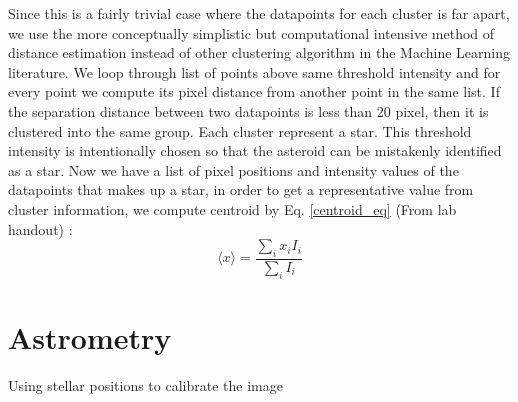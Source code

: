 \documentclass[authoryear, 12pt,5p, times]{elsarticle}
\begin{document}
Since this is a fairly trivial case where the datapoints for each cluster is far apart, we use the more conceptually simplistic but computational intensive method of distance estimation instead of other clustering algorithm in the Machine Learning literature.  We loop through list of points above same threshold intensity and for every point we compute its pixel distance from another point in the same list. If the separation distance between two datapoints is less than 20 pixel, then it is clustered into the same group. Each cluster represent a star. This threshold intensity is intentionally chosen so that the asteroid can be mistakenly identified as a star. Now we have a list of pixel positions and intensity values of the datapoints that makes up a star, in order to get a representative value from cluster information, we compute centroid by Eq. \ref{centroid_eq} (From lab handout) :
\begin{equation}
\langle x\rangle = \frac{\sum \limits_{i} x_i I_i}{\sum\limits_{i} I_i}
\label{centroid_eq}
\end{equation}

\section{Astrometry}
Using stellar positions to calibrate the image
\end{document}
